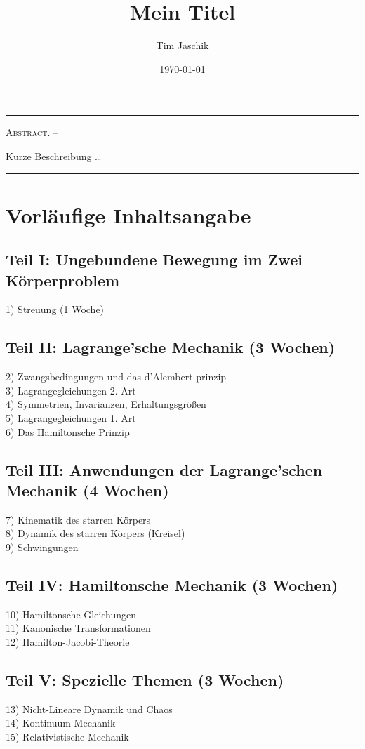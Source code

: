 \documentclass[10pt, letterpaper]{article}
\title{Mein Titel}
\author{Tim Jaschik}
\date{\today}
\renewenvironment{abstract}
  {
    \begin{adjustwidth}{1.5cm}{1.5cm}
    \small
    \textsc{Abstract. –}%
  }
  {
    \end{adjustwidth}
  }
\begin{document}
\maketitle
\rule{\textwidth}{0.5pt}
\begin{abstract}
Kurze Beschreibung …
\end{abstract}
\rule{\textwidth}{0.5pt}
\vspace{0.5cm}

\tableofcontents

\pagebreak

\section{Vorläufige Inhaltsangabe}

\subsection*{Teil I: Ungebundene Bewegung im Zwei Körperproblem}
1) Streuung \hfill (1 Woche)

\subsection*{Teil II: Lagrange'sche Mechanik \hfill (3 Wochen)}
2) Zwangsbedingungen und das d'Alembert prinzip\\
3) Lagrangegleichungen 2. Art\\
4) Symmetrien, Invarianzen, Erhaltungsgrößen\\
5) Lagrangegleichungen 1. Art\\
6) Das Hamiltonsche Prinzip

\subsection*{Teil III: Anwendungen der Lagrange'schen Mechanik \hfill (4 Wochen)}
7) Kinematik des starren Körpers\\
8) Dynamik des starren Körpers (Kreisel)\\
9) Schwingungen

\subsection*{Teil IV: Hamiltonsche Mechanik \hfill (3 Wochen)}
10) Hamiltonsche Gleichungen\\
11) Kanonische Transformationen\\
12) Hamilton-Jacobi-Theorie

\subsection*{Teil V: Spezielle Themen \hfill (3 Wochen)}
13) Nicht-Lineare Dynamik und Chaos\\
14) Kontinuum-Mechanik\\
15) Relativistische Mechanik
\end{document}
